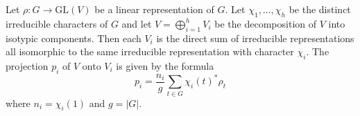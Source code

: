 Let $\rho: G \to \mathrm{GL}(V)$ be a linear representation of $G$.
Let $\chi_1, \ldots, \chi_h$ be the distinct irreducible characters of $G$ and let $V = \bigoplus_{i=1}^h V_i$ be the decomposition of $V$ into isotypic components.
Then each $V_i$ is the direct sum of irreducible representations all isomorphic to the same irreducible representation with character $\chi_i$.
The projection $p_i$ of $V$ onto $V_i$ is given by the formula
$$p_i = \frac{n_i}{g} \sum_{t \in G} \chi_i(t)^* \rho_t$$
where $n_i = \chi_i(1)$ and $g = |G|$.

